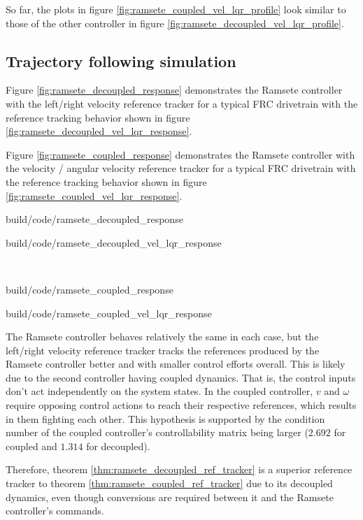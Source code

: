 So far, the plots in figure \ref{fig:ramsete_coupled_vel_lqr_profile} look
similar to those of the other \gls{controller} in figure
\ref{fig:ramsete_decoupled_vel_lqr_profile}.

\subsection{Trajectory following simulation}

Figure \ref{fig:ramsete_decoupled_response} demonstrates the Ramsete controller
with the left/right velocity \gls{reference} tracker for a typical FRC
drivetrain with the \gls{reference} tracking behavior shown in figure
\ref{fig:ramsete_decoupled_vel_lqr_response}.

Figure \ref{fig:ramsete_coupled_response} demonstrates the Ramsete controller
with the velocity / angular velocity \gls{reference} tracker for a typical FRC
drivetrain with the \gls{reference} tracking behavior shown in figure
\ref{fig:ramsete_coupled_vel_lqr_response}.

\begin{bookfigure}
  \begin{minisvg}{build/code/ramsete_decoupled_response}
    \caption{Ramsete controller response with left/right velocity reference
      tracker ($b = 2$, $\zeta = 0.7$)}
    \label{fig:ramsete_decoupled_response}
  \end{minisvg}
  \hfill
  \begin{minisvg}{build/code/ramsete_decoupled_vel_lqr_response}
    \caption{Ramsete controller's left/right velocity reference tracker
      response}
    \label{fig:ramsete_decoupled_vel_lqr_response}
  \end{minisvg} \\
  \begin{minisvg}{build/code/ramsete_coupled_response}
    \caption{Ramsete controller response with velocity / angular velocity
      reference tracker ($b = 2$, $\zeta = 0.7$)}
    \label{fig:ramsete_coupled_response}
  \end{minisvg}
  \hfill
  \begin{minisvg}{build/code/ramsete_coupled_vel_lqr_response}
    \caption{Ramsete controller's velocity / angular velocity reference tracker
      response}
    \label{fig:ramsete_coupled_vel_lqr_response}
  \end{minisvg}
\end{bookfigure}

The Ramsete \gls{controller} behaves relatively the same in each case, but the
left/right velocity \gls{reference} tracker tracks the \glspl{reference}
produced by the Ramsete \gls{controller} better and with smaller
\glspl{control effort} overall. This is likely due to the second
\gls{controller} having coupled dynamics. That is, the control inputs don't act
independently on the system \glspl{state}. In the coupled \gls{controller}, $v$
and $\omega$ require opposing control actions to reach their respective
\glspl{reference}, which results in them fighting each other. This hypothesis is
supported by the condition number of the coupled \gls{controller}'s
controllability matrix being larger ($2.692$ for coupled and $1.314$ for
decoupled).

Therefore, theorem \ref{thm:ramsete_decoupled_ref_tracker} is a superior
\gls{reference} tracker to theorem \ref{thm:ramsete_coupled_ref_tracker} due to
its decoupled dynamics, even though conversions are required between it and the
Ramsete \gls{controller}'s commands.
